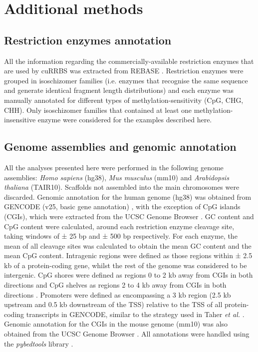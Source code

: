 \smallskip

\section{Additional methods} \label{s:4.7}

\subsection*{Restriction enzymes annotation}

All the information regarding the commercially-available restriction enzymes that are used by cuRRBS was extracted from REBASE \cite{Roberts2005,Roberts2015}. Restriction enzymes were grouped in isoschizomer families (i.e. enzymes that recognise the same sequence and generate identical fragment length distributions) and each enzyme was manually annotated for different types of methylation-sensitivity (CpG, CHG, \acrshort{CHH}). Only isoschizomer families that contained at least one methylation-insensitive enzyme were considered for the examples described here.

\subsection*{Genome assemblies and genomic annotation}

All the analyses presented here were performed in the following genome assemblies: \textit{Homo sapiens} (hg38), \textit{Mus musculus} (mm10) and \textit{Arabidopsis thaliana} (TAIR10). Scaffolds not assembled into the main chromosomes were discarded. Genomic annotation for the human genome (hg38) was obtained from GENCODE (v25, basic gene annotation) \cite{Harrow2012}, with the exception of CpG islands (CGIs), which were extracted from the UCSC Genome Browser \cite{Bock2007}. GC content and CpG content were calculated, around each restriction enzyme cleavage site, taking windows of  ± 25 bp and ± 500 bp respectively. For each enzyme, the mean of all cleavage sites was calculated to obtain the mean GC content and the mean CpG content. Intragenic regions were defined as those regions within ± 2.5 \acrshort{kb} of a protein-coding gene, whilst the rest of the genome was considered to be intergenic. CpG shores were defined as regions 0 to 2 kb away from CGIs in both directions and CpG shelves as regions 2 to 4 kb away from CGIs in both directions \cite{Zhang2015}. Promoters were defined as encompassing a 3 kb region (2.5 kb upstream and 0.5 kb downstream of the  \acrshort{TSS}) relative to the TSS of all protein-coding transcripts in GENCODE, similar to the strategy used in Taher \textit{et al.} \cite{Taher2013}. Genomic annotation for the CGIs in the mouse genome (mm10) was also obtained from the UCSC Genome Browser \cite{Bock2007}. All annotations were handled using the \textit{pybedtools} library \cite{Quinlan2011,Quinlan2010}.

